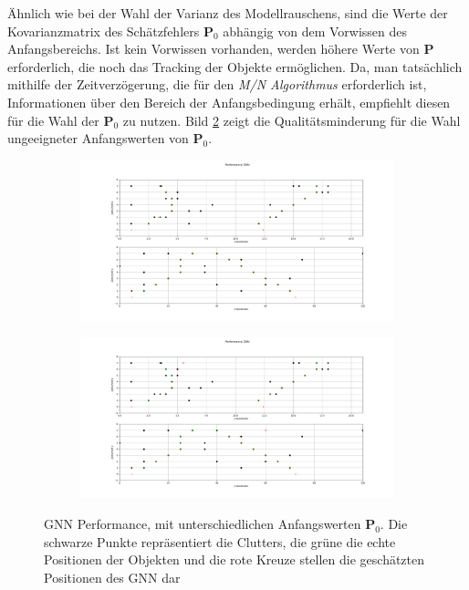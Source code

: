 \documentclass[10pt,a4paper]{article}
\begin{document}
Ähnlich wie bei der Wahl der Varianz des Modellrauschens, sind die Werte der Kovarianzmatrix des Schätzfehlers $\textbf{P}_0$ abhängig von dem Vorwissen des Anfangsbereichs. Ist kein Vorwissen vorhanden, werden höhere Werte von $\textbf{P}$ erforderlich, die noch das Tracking der Objekte ermöglichen. Da, man tatsächlich mithilfe der Zeitverzögerung, die für den \textit{M/N Algorithmus} erforderlich ist, Informationen über den Bereich der Anfangsbedingung erhält, empfiehlt \cite{IDS} diesen für die Wahl der $\textbf{P}_0$ zu nutzen. Bild \ref{pic:GNNP} zeigt die Qualitätsminderung für die Wahl ungeeigneter Anfangswerten von $\textbf{P}_0$.\\
\begin{figure}[h!]
    \centering
    \begin{subfigure}{0.6\textwidth}
        \includegraphics[width=11cm]{./Pictures_report/GNNP0.png}
    \end{subfigure}

\medskip
    \begin{subfigure}{0.6\textwidth}
        \includegraphics[width= 11cm]{./Pictures_report/GNNP1.png}
        \label{fig:arm4}
    \end{subfigure}
    \caption[]{GNN Performance, mit unterschiedlichen Anfangswerten $\textbf{P}_0$. Die schwarze Punkte repräsentiert die Clutters, die grüne die echte Positionen der Objekten und die rote Kreuze stellen die geschätzten Positionen des GNN dar  }
    \label{pic:GNNP}
\end{figure}
\end{document}
